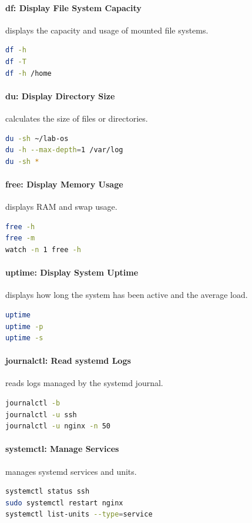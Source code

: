 \paragraph*{df: Display File System Capacity}
 displays the capacity and usage of mounted file systems.
\begin{lstlisting}[language=bash]
df -h
df -T
df -h /home
\end{lstlisting}

\paragraph*{du: Display Directory Size}
 calculates the size of files or directories.
\begin{lstlisting}[language=bash]
du -sh ~/lab-os
du -h --max-depth=1 /var/log
du -sh *
\end{lstlisting}

\paragraph*{free: Display Memory Usage}
 displays RAM and swap usage.
\begin{lstlisting}[language=bash]
free -h
free -m
watch -n 1 free -h
\end{lstlisting}

\paragraph*{uptime: Display System Uptime}
 displays how long the system has been active and the average load.
\begin{lstlisting}[language=bash]
uptime
uptime -p
uptime -s
\end{lstlisting}

\paragraph*{journalctl: Read systemd Logs}
 reads logs managed by the systemd journal.
\begin{lstlisting}[language=bash]
journalctl -b
journalctl -u ssh
journalctl -u nginx -n 50
\end{lstlisting}

\paragraph*{systemctl: Manage Services}
 manages systemd services and units.
\begin{lstlisting}[language=bash]
systemctl status ssh
sudo systemctl restart nginx
systemctl list-units --type=service
\end{lstlisting}

